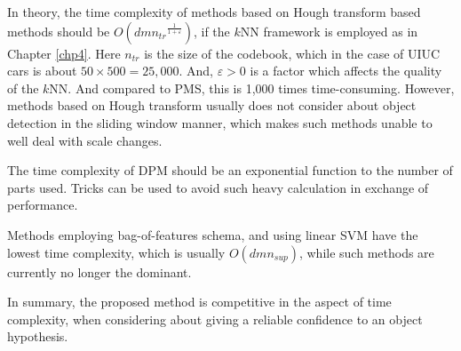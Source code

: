 \documentclass[paper]{ieice}
\begin{document}
In theory, the time complexity of methods based on Hough transform based methods should be $O(dm{n_{tr}}^{\frac 1 {1+\varepsilon}})$, if the $k$NN framework is employed as in Chapter \ref{chp4}. Here $n_{tr}$ is the size of the codebook, which in the case of UIUC cars is about $50\times 500=25,000$. And, $\varepsilon > 0$ is a factor which affects the quality of the $k$NN. And compared to PMS, this is 1,000 times time-consuming. However, methods based on Hough transform usually does not consider about object detection in the sliding window manner, which makes such methods unable to well deal with scale changes.

The time complexity of DPM should be an exponential function to the number of parts used. Tricks can be used to avoid such heavy calculation in exchange of performance.

Methods employing bag-of-features schema, and using linear SVM have the lowest time complexity, which is usually  $O(dmn_{sup})$, while such methods are currently no longer the dominant.

In summary, the proposed method is competitive in the aspect of time complexity, when considering about giving a reliable confidence to an object hypothesis.
\end{document}
